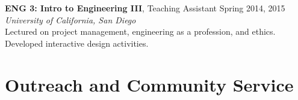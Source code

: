 \documentclass[]{res}
\begin{document}
\begin{resume}
\textbf{ENG 3: Intro to Engineering III}, Teaching Assistant \hfill Spring 2014, 2015 \\
\textit{University of California, San Diego} \\
Lectured on project management, engineering as a profession, and ethics. \\
Developed interactive design activities.


%


%
%
%
%
%
%


\section{Outreach and Community Service}
\vspace{0.1in}
%


\end{resume}
\end{document}
